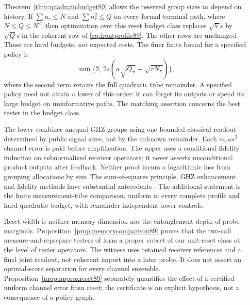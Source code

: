 Theorem~\ref{thm:quadraticbudget89} allows the reserved group sizes
to depend on history.  If $\sum n_r\le N$ and $\sum n_r^2\le Q$
on every formal terminal path, where $N\le Q\le N^2$, then
optimization over this reset budget class replaces $\sqrt V s$
by $\sqrt Q s$ in the coherent row of \eqref{eq:frontprofile89}.
The other rows are unchanged.  These are hard budgets, not expected
costs.  The finer finite bound for a specified policy is
\[
 \min\{2,\,2s(\alpha\sqrt{Q_\pi}+\sqrt{rN_\pi})\},
\]
where the second term retains the full quadratic tube remainder.
A specified policy need not attain a lower of this order: it can
forget its outputs or spend its large budget on uninformative paths.
The matching assertion concerns the best tester in the budget class.

The lower combines unequal GHZ groups using one bounded classical
readout determined by public signal sizes, not by the unknown
remainder.  Each $m_r\kappa s^2$ channel error is paid before
amplification.  The upper uses a conditional fidelity induction on
subnormalized receiver operators; it never asserts unconditional
product outputs after feedback.  Neither proof incurs a logarithmic
loss from grouping allocations by size.  The sum-of-squares principle,
GHZ enhancement and fidelity methods have substantial antecedents
\cite{Hyllus78,Toth78,HMNW88,YF76}.  The additional statement is the
finite measurement-tube comparison, uniform in every complete
profile and hard quadratic budget, with remainder-independent lower
controls.

Reset width is neither memory dimension nor the entanglement depth
of probe marginals.  Proposition~\ref{prop:memorycomparison89}
proves that the two-call measure-and-reprepare testers of
\cite[Definition~23]{OZNPQ89} form a proper subset of our unit-reset
class at the level of tester operators.  The witness uses retained
receiver references and a final joint readout, not coherent import
into a later probe.  It does not assert an optimal-score separation
for every channel ensemble.  Proposition~\ref{prop:approxreset89}
separately quantifies the effect of a certified uniform channel
error from reset; the certificate is an explicit hypothesis,
not a consequence of a policy graph.

